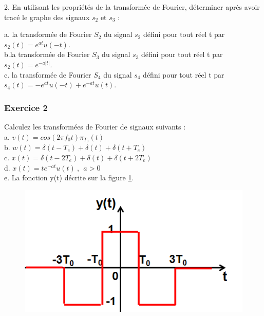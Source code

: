 	2. En utilisant les propriétés de la transformée de Fourier, déterminer après avoir tracé le graphe des signaux $s_2$ et $s_3$ :
	
	a. la transformée de Fourier $S_2$ du signal $s_2$ défini pour tout réel t par $s_2(t)=e^{at}u(-t)$.\\
	
	b.la transformée de Fourier $S_3$ du signal $s_3$ défini pour tout réel t par $s_2(t)=e^{-a|t|}$.\\
	
	c. la transformée de Fourier $S_4$ du signal $s_4$ défini pour tout réel t par $s_4(t)=-e^{at}u(-t)+e^{-at}u(t)$.\\
	
	\subsubsection{Exercice 2}
	
	Calculez les transformées de Fourier de signaux suivants :\\
	
	a. $v(t) = cos(2\pi f_0 t)\pi_{T_0}(t)$\\
	
	b. $w(t) = \delta(t-T_e)+\delta(t)+\delta(t+T_e)$\\
	
	c. $x(t) = \delta(t-2T_e)+\delta(t)+\delta(t+2T_e)$\\
	
	d. $x(t) = te^{-at}u(t)~,~~a>0$\\
	
	e. La fonction y(t) décrite sur la figure \ref{Fig:Exo_TF_2}.
	
	\begin{figure}[h!]
		\centering
		\includegraphics[scale=0.6]{images/exo_2_TF.png}
		\label{Fig:Exo_TF_2} 
	\end{figure}
	
